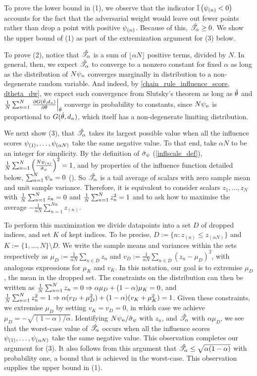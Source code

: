 To prove the lower bound in (1), we observe that the indicator $\mathbb{I}\left(\psi_{(n)} <
0\right)$ accounts for the fact that the adversarial weight would leave out fewer
points rather than drop a point with positive $\psi_{(n)}$.  Because of this,
$\hat{\mathscr{T}}_\alpha \ge 0$. We show the upper bound of (1) as part of the extremization
argument for (3) below.

To prove (2), notice that $\hat{\mathscr{T}}_\alpha$ is a sum of $\lfloor \alpha N \rfloor$
positive terms, divided by $N$. In general, then, we expect $\hat{\mathscr{T}}_\alpha$ to converge
to a nonzero constant for fixed $\alpha$ as long as the distribution of $N
\psi_n$ converges marginally in distribution to a non-degenerate random
variable.  And indeed, by \eqref{chain_rule_influence_score, dtheta_dw}, we
expect such convergence from Slutsky's theorem as long as $\hat{\theta}$ and
$\frac{1}{N}\sum_{n=1}^N \left.\frac{\partial G(\hat{\theta}, d_n)}{\partial\theta}\right|_{\hat{\theta}}$
converge in probability to constants, since $N \psi_n$ is proportional to
$G(\hat{\theta}, d_n)$, which itself has a non-degenerate limiting distribution.

We next show (3), that $\hat{\mathscr{T}}_\alpha$ takes its largest possible value when all the
influence scores $\psi_{(1)}, \ldots, \psi_{(\alpha N)}$ take the same
negative value. To that end, take $\alpha N$ to be an integer for simplicity. By
the definition of $\hat{\sigma}_{\psi}$ (\eqref{inflscale_def}), $\frac{1}{N}\sum_{n=1}^N \left( \frac{N
\psi_{(n)}}{\hat{\sigma}_{\psi}} \right)^2 = 1$, and by properties of the influence
function detailed below, $\sum_{n=1}^N \psi_n = 0$
(). So $\hat{\mathscr{T}}_\alpha$ is a
tail average of scalars with zero sample mean and unit sample variance.
Therefore, it is equivalent to consider scalars $z_1, \ldots, z_N$ with $\frac{1}{N}\sum_{n=1}^N
z_n = 0$ and $\frac{1}{N}\sum_{n=1}^N z_n^2 = 1$ and to ask how to maximise the average
$-\frac{1}{\alpha N} \sum_{n=1}^{N\alpha} z_{(n)}$.

To perform this maximization we divide datapoints into a set $D$ of dropped
indices, and set $K$ of kept indices. To be precise, $D := \{n: z_{(n)} \le
z_{(\alpha N)} \}$ and $K := \{1,\ldots,N\} \setminus D$. We write the sample
means and variances within the sets respectively as $\mu_D := \frac{1}{\alpha N}
\sum_{n \in D} z_n$ and $v_D := \frac{1}{\alpha N} \sum_{n \in D} (z_n -
\mu_D)^2$, with analogous expressions for $\mu_K$ and $v_K$. In this notation,
our goal is to extremise $\mu_D$, the mean in the dropped set.   The constraints
on the distribution can then be written as $\frac{1}{N}\sum_{n=1}^N z_n = 0 \Rightarrow \alpha
\mu_D + (1- \alpha) \mu_K = 0$, and $\frac{1}{N}\sum_{n=1}^N z_n^2 = 1 \Rightarrow \alpha(v_D +
\mu_D^2) + (1 - \alpha) (v_K + \mu_K^2)  = 1$. Given these constraints, we
extremise $\mu_D$ by setting $v_K = v_D = 0$, in which case we achieve $\mu_D =
-\sqrt{(1 - \alpha) / \alpha}$. Identifying $N \psi_n / \hat{\sigma}_{\psi}$ with $z_n$,
and $\hat{\mathscr{T}}_\alpha$ with $\alpha \mu_D$, we see that the worst-case value of $\hat{\mathscr{T}}_\alpha$
occurs when all the influence scores $\psi_{(1)}, \ldots, \psi_{(\alpha N)}$
take the same negative value. This observation completes our argument for (3).
It also follows from this argument that $\hat{\mathscr{T}}_\alpha \le \sqrt{\alpha (1 - \alpha)}$
with probability one, a bound that is achieved in the worst-case. This
observation supplies the upper bound in (1).

